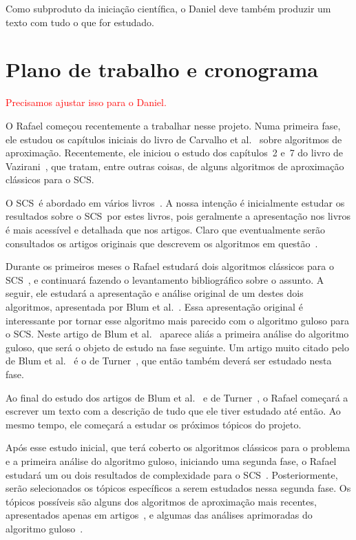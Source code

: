 \documentclass[12pt]{article}
\begin{document}
Como subproduto da iniciação científica, o Daniel deve também produzir
um texto com tudo o que for estudado. 

\section{Plano de trabalho e cronograma}

\textcolor{red}{Precisamos ajustar isso para o Daniel.}

O Rafael começou recentemente a trabalhar nesse projeto. Numa primeira
fase, ele estudou os capítulos iniciais do livro de Carvalho et
al.~\cite{CarvalhoCDGFFFMPSW01} sobre algoritmos de aproximação.
Recentemente, ele iniciou o estudo dos capítulos~2 e~7 do livro de
Vazirani~\cite{Vazirani01}, que tratam, entre outras coisas, de alguns
algoritmos de aproximação clássicos para o SCS.

O SCS\ é abordado em vários
livros~\cite{Gusfield97,SetubalM97,Vazirani01}. A nossa intenção é
inicialmente estudar os resultados sobre o SCS\ por estes livros,
pois geralmente a apresentação nos livros é mais acessível e detalhada
que nos artigos. Claro que eventualmente serão consultados os artigos
originais que descrevem os algoritmos em
questão~\cite{BlumJLTY94,Li90,Turner89}.

Durante os primeiros meses o Rafael estudará dois algoritmos clássicos
para o SCS~\cite{Gusfield97,SetubalM97,Vazirani01}, e continuará
fazendo o levantamento bibliográfico sobre o assunto. A seguir, ele
estudará a apresentação e análise original de um destes dois
algoritmos, apresentada por Blum et al.~\cite{BlumJLTY94}. Essa
apresentação original é interessante por tornar esse algoritmo mais
parecido com o algoritmo guloso para o SCS. Neste artigo de Blum et
al.~\cite{BlumJLTY94} aparece aliás a primeira análise do algoritmo
guloso, que será o objeto de estudo na fase seguinte. Um artigo muito
citado pelo de Blum et al.~\cite{BlumJLTY94} é o de
Turner~\cite{Turner89}, que então também deverá ser estudado nesta
fase.


Ao final do estudo dos artigos de Blum et al.~\cite{BlumJLTY94} e de
Turner~\cite{Turner89}, o Rafael começará a escrever um texto com a
descrição de tudo que ele tiver estudado até então. Ao mesmo tempo,
ele começará a estudar os próximos tópicos do projeto.

Após esse estudo inicial, que terá coberto os algoritmos clássicos
para o problema e a primeira análise do algoritmo guloso, iniciando
uma segunda fase, o Rafael estudará um ou dois resultados de
complexidade para o SCS~\cite{BlumJLTY94,GallantMS80,Vassilevska05}.
Posteriormente, serão selecionados os tópicos específicos a serem
estudados nessa segunda fase. Os tópicos possíveis são alguns dos
algoritmos de aproximação mais recentes, apresentados apenas em
artigos~\cite{ArmenS95a,ArmenS98,Bongartz01,CzumajGPR97,KosarajuPS94,Sweedyk00,TengY97},
e algumas das análises aprimoradas do algoritmo
guloso~\cite{ArmenS95,KaplanS05,WeinardS06}.
\end{document}

